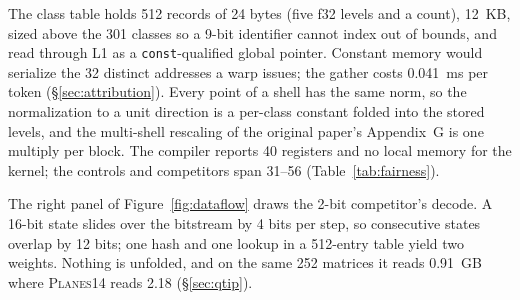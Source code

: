 The class table holds 512 records of 24 bytes (five f32 levels and a count),
12~KB, sized above the 301 classes so a 9-bit identifier cannot index out
of bounds, and read through L1 as a \texttt{const}-qualified global pointer.
Constant memory would serialize the 32 distinct addresses a warp issues;
the gather costs 0.041~ms per token (\S\ref{sec:attribution}).
Every point of a shell has the same norm, so the normalization to a unit
direction is a per-class constant folded into the stored levels, and the
multi-shell rescaling of the original paper's Appendix~G is one multiply per
block. The compiler reports 40 registers and no local memory for the kernel; the
controls and competitors span 31--56 (Table~\ref{tab:fairness}).

The right panel of Figure~\ref{fig:dataflow} draws the 2-bit competitor's
decode. A 16-bit state slides over the bitstream by 4 bits per step, so
consecutive states overlap by 12 bits; one hash and one lookup in a
512-entry table yield two weights. Nothing is unfolded, and on the same 252
matrices it reads 0.91~GB where \textsc{Planes14} reads 2.18
(\S\ref{sec:qtip}).

